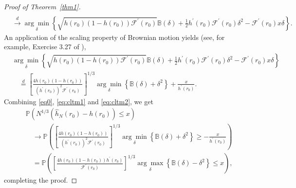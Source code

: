 \documentclass[12pt]{amsart}
\theoremstyle{plain}
\theoremstyle{remark}
\numberwithin{equation}{section}
\begin{document}
\begin{proof}[Proof of Theorem~\ref{thm1}]
\begin{align}
\\ &\stackrel{d}{\to} \underset{\delta}{\arg \min }\left\{\sqrt{h(r_0)(1-h(r_0))\mathcal{F}^{\prime}\left(r_{0}\right)} \mathbb{B}(\delta)+\frac{1}{2} h^{\prime}\left(r_{0}\right) \mathcal{F}^{\prime}\left(r_{0}\right) \delta^{2}-\mathcal{F}^{\prime}\left(r_{0}\right)x\delta\right\}. 
\end{align}
An application of the scaling property of Brownian motion yields (see, for example, Exercise 3.27 of \cite{MR3445293}), 
\begin{align}\label{eq:cltm2}
&\underset{\delta}{\arg \min }\left\{\sqrt{h(r_0)(1-h(r_0))\mathcal{F}^{\prime}\left(r_{0}\right)} \mathbb{B}(\delta)+\frac{1}{2} h^{\prime}\left(r_{0}\right) \mathcal{F}^{\prime}\left(r_{0}\right) \delta^{2}-\mathcal{F}^{\prime}\left(r_{0}\right)x\delta\right\} \nonumber
\\ & \quad\stackrel{d}{=}\left[\frac{4 h(r_0)(1-h(r_0))}{\left(h^{\prime }\left(r_{0}\right)\right)^2 \mathcal{F}^{\prime}\left(r_{0}\right)}\right]^{1 / 3} \underset{\delta}{\arg \min }\left\{\mathbb{B}(\delta)+\delta^{2}\right\}+\frac{x}{h^{\prime}\left(r_{0}\right)}.
\end{align}
Combining \eqref{eq0}, \eqref{eq:cltm1} and \eqref{eq:cltm2}, we get
$$
\begin{aligned}
& \mathbb{P}\left(N^{1 / 3}\left(\hat{h}_{N}\left(r_{0}\right)-h\left(r_{0}\right)\right) \leq x\right) \\
& \quad \rightarrow \mathbb{P}\left(\left[\frac{4 h(r_0)(1-h(r_0))}{\left(h^{\prime }\left(r_{0}\right)\right)^2 \mathcal{F}^{\prime}\left(r_{0}\right)}\right]^{1 / 3} \underset{\delta}{\arg \min }\left\{\mathbb{B}(\delta)+\delta^{2}\right\} \geq-\frac{x}{h^{\prime}\left(r_{0}\right)}\right) \\
& \quad=\mathbb{P}\left(\left[\frac{4h(r_0)(1-h(r_0)) h^{\prime}\left(r_{0}\right)}{\mathcal{F}^{\prime}\left(r_{0}\right)}\right]^{1 / 3} \underset{\delta}{\arg \max }\left\{\mathbb{B}(\delta)-\delta^{2}\right\} \leq x\right),
\end{aligned}
$$
completing the proof.
\end{proof}
\end{document}
